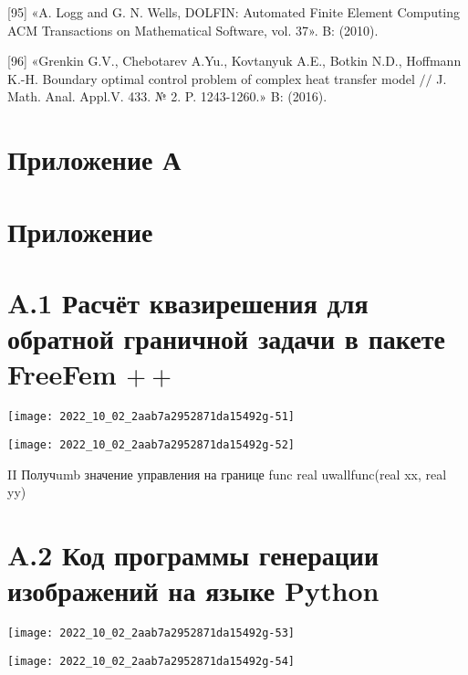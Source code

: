 \documentclass[10pt]{article}
\begin{document}
[95] «A. Logg and G. N. Wells, DOLFIN: Automated Finite Element Computing ACM Transactions on Mathematical Software, vol. 37». B: (2010).

[96] «Grenkin G.V., Chebotarev A.Yu., Kovtanyuk A.E., Botkin N.D., Hoffmann K.-H. Boundary optimal control problem of complex heat transfer model $/ /$ J. Math. Anal. Appl.V. 433. № 2. P. 1243-1260.» B: (2016).

\section{Приложение А}
\section{Приложение}
\section{A.1 Расчёт квазирешения для обратной граничной задачи в пакете FreeFem $++$}
\begin{center}
\texttt{[image: 2022\_10\_02\_2aab7a2952871da15492g-51]}
\end{center}

\begin{center}
\texttt{[image: 2022\_10\_02\_2aab7a2952871da15492g-52]}
\end{center}

II Получumb значение управления на границе func real uwallfunc(real xx, real yy)

\section{A.2 Код программы генерации изображений на языке Python}
\begin{center}
\texttt{[image: 2022\_10\_02\_2aab7a2952871da15492g-53]}
\end{center}

\begin{center}
\texttt{[image: 2022\_10\_02\_2aab7a2952871da15492g-54]}
\end{center}
\end{document}
